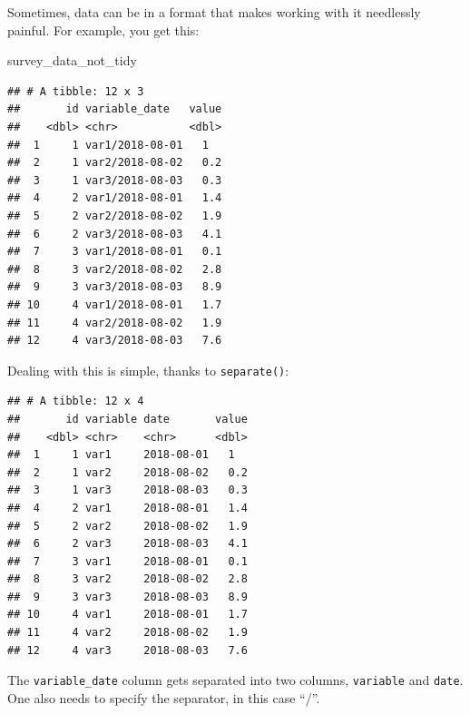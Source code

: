 \documentclass[]{gitbook}
\newenvironment{Shaded}{\begin{snugshade}}{\end{snugshade}}
\newcommand{\DataTypeTok}[1]{\textcolor[rgb]{0.13,0.29,0.53}{#1}}
\newcommand{\KeywordTok}[1]{\textcolor[rgb]{0.13,0.29,0.53}{\textbf{#1}}}
\newcommand{\NormalTok}[1]{#1}
\newcommand{\OperatorTok}[1]{\textcolor[rgb]{0.81,0.36,0.00}{\textbf{#1}}}
\newcommand{\StringTok}[1]{\textcolor[rgb]{0.31,0.60,0.02}{#1}}
\theoremstyle{definition}
\theoremstyle{definition}
\theoremstyle{definition}
\theoremstyle{remark}
\begin{document}
Sometimes, data can be in a format that makes working with it needlessly
painful. For example, you get this:

\begin{Shaded}
\begin{Highlighting}[]
\NormalTok{survey_data_not_tidy}
\end{Highlighting}
\end{Shaded}

\begin{verbatim}
## # A tibble: 12 x 3
##       id variable_date   value
##    <dbl> <chr>           <dbl>
##  1     1 var1/2018-08-01   1  
##  2     1 var2/2018-08-02   0.2
##  3     1 var3/2018-08-03   0.3
##  4     2 var1/2018-08-01   1.4
##  5     2 var2/2018-08-02   1.9
##  6     2 var3/2018-08-03   4.1
##  7     3 var1/2018-08-01   0.1
##  8     3 var2/2018-08-02   2.8
##  9     3 var3/2018-08-03   8.9
## 10     4 var1/2018-08-01   1.7
## 11     4 var2/2018-08-02   1.9
## 12     4 var3/2018-08-03   7.6
\end{verbatim}

Dealing with this is simple, thanks to \texttt{separate()}:

\begin{Shaded}
\end{Shaded}

\begin{verbatim}
## # A tibble: 12 x 4
##       id variable date       value
##    <dbl> <chr>    <chr>      <dbl>
##  1     1 var1     2018-08-01   1  
##  2     1 var2     2018-08-02   0.2
##  3     1 var3     2018-08-03   0.3
##  4     2 var1     2018-08-01   1.4
##  5     2 var2     2018-08-02   1.9
##  6     2 var3     2018-08-03   4.1
##  7     3 var1     2018-08-01   0.1
##  8     3 var2     2018-08-02   2.8
##  9     3 var3     2018-08-03   8.9
## 10     4 var1     2018-08-01   1.7
## 11     4 var2     2018-08-02   1.9
## 12     4 var3     2018-08-03   7.6
\end{verbatim}

The \texttt{variable\_date} column gets separated into two columns,
\texttt{variable} and \texttt{date}. One also needs to specify the
separator, in this case ``/''.
\end{document}
